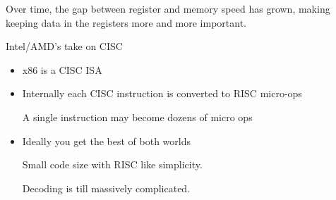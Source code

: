 \documentclass{report}
\begin{document}
\begin{description}
        Over time, the gap between register and memory speed has grown,
        making keeping data in the registers more and more important.

    \item Intel/AMD's take on CISC

        \begin{itemize}
            \item x86 is a CISC ISA
            \item Internally each CISC instruction is converted to RISC micro-ops

                A single instruction may become dozens of micro ops

            \item Ideally you get the best of both worlds

                Small code size with RISC like simplicity. 

                Decoding is till massively complicated. 
        \end{itemize}

\end{description}
\end{document}
